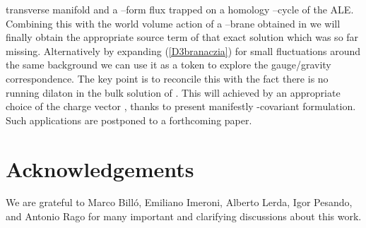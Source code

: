 \documentclass[a4paper,11pt]{article}
\begin{document}
\coordHE{} transverse manifold and a \coordHE{}--form flux trapped on
a homology \coordHE{}--cycle of the ALE.  Combining this with the world volume action of
a \coordHE{}--brane obtained in \cite{noidued3} we will finally obtain the appropriate
source term of that exact solution
which was so far missing. Alternatively by expanding (\ref{D3branaczia}) for small fluctuations around
the same background we can use it as a token to explore
the gauge/gravity correspondence. The key point is to reconcile this
with the fact there is no running dilaton  in the bulk  solution of
\cite{noidued3}. This will achieved by an appropriate choice of the
charge vector \coordHE{}, thanks to present manifestly
\coordHE{}-covariant formulation. Such applications are postponed to a
forthcoming paper.
\section*{Acknowledgements}
We are grateful to Marco Bill\'o, Emiliano Imeroni, Alberto Lerda, Igor Pesando, and Antonio Rago for many important and clarifying discussions about this work.
\par
\appendix
\end{document}
